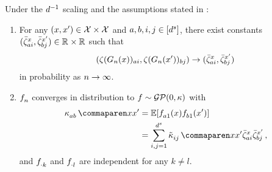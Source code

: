 \documentclass{article}
\begin{document}
\begin{theorem}\label{thm:linear_scaling_limit}
    Under the $d^{-1}$ scaling and the assumptions stated in \citep{yang2019v2}:
    \vspace{-0.5\baselineskip}
    \begin{enumerate}[\hspace{-0.5em}(I)]
        \renewcommand\labelenumi{\emph{\bfseries(\theenumi)}}
        \item 
        For any $(x, x') \in \mathcal{X} \times \mathcal{X}$ and $a, b, i, j \in [d^s]$, there exist constants $(\bar{\zeta}_{a i}^x, \bar{\zeta}_{b j}^{x'}) \in \mathbb{R}^{} \times \mathbb{R}^{}$ such that
        \begin{align}\label{eq:logit_determ_limit}
            (
                \softmax(
                    \logitSymbol_{\sequenceVariable}%
                    (\inputSymbol)
                )_{ai},
                \softmax(
                    \logitSymbol_{\sequenceVariable}%
                    (\inputSymbol')
                )_{bj}
            ) 
            \to 
            ( 
                \softmaxMean_{a i}^\inputSymbol,
                \softmaxMean_{b j}^{\inputSymbol'}
            )
        \end{align}
        in probability as $n \to \infty$.
        
        \item 
        $f_{n}^{}$ %
        converges in distribution to $\activationSymbol%
        \sim \gp(0, \kernel)$ with 
        \begin{align}\label{eq:determ_kernel}
            \kernelf{a b}{}{\inputSymbol}{\inputSymbol'}
            &=
            \E [
                \indexedActivation{}{a1}{\inputSymbol}
                \indexedActivation{}{b1}{\inputSymbol'}
            ]
            \\
            &=
            \sum_{i , j = 1}^{\spatialDimension} 
                \kerntildef{i j}{}{\inputSymbol}{\inputSymbol'}
                    \softmaxMean_{a i}^\inputSymbol
                    \softmaxMean_{b j}^{\inputSymbol'}
            \nonumber
            \, ,
        \end{align}
        and $f_{\cdot k}^{}$ and $f_{\cdot l}^{}$ are independent for any $k \neq l$.
    \end{enumerate}
\end{theorem}
\end{document}
